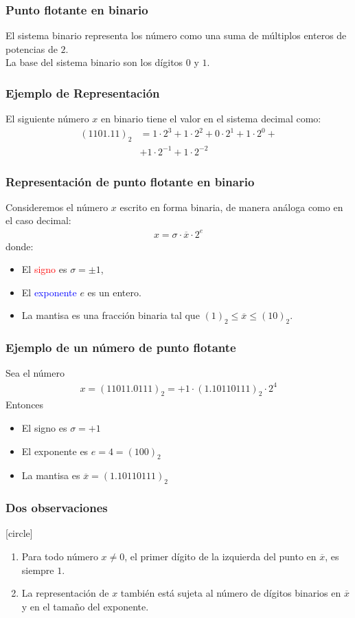 \begin{frame}
\frametitle{Punto flotante en binario}
El sistema binario representa los número como una suma de múltiplos enteros de potencias de $2$.
\\
\bigskip
\pause
La base del sistema binario son los dígitos $0$ y $1$.
\end{frame}
\begin{frame}
\frametitle{Ejemplo de Representación}
El siguiente número $x$ en binario tiene el valor en el sistema decimal como:
\begin{align*}
(1101.11)_{2} &= 1 \cdot 2^{3} + 1 \cdot 2^{2} + 0 \cdot 2^{1} + 1 \cdot 2^{0} + \\
 &+ 1 \cdot 2^{-1} + 1 \cdot 2^{-2}
\end{align*}
\end{frame}
\begin{frame}
\frametitle{Representación de punto flotante en binario}
Consideremos el número $x$ escrito en forma binaria, de manera análoga como en el caso decimal:
\begin{align*}
x =  \sigma \cdot \overline{x} \cdot 2^{e}
\end{align*}
\pause
donde: 
\begin{itemize}
\item El \textcolor{red}{signo} es $\sigma= \pm 1$,
\item El \textcolor{blue}{exponente} $e$ es un entero.
\item La \textcolor{ao}{mantisa} es una fracción binaria tal que $ (1)_{2} \leq \overline{x} \leq (10)_{2}$.
\end{itemize}
\end{frame}
\begin{frame}
\frametitle{Ejemplo de un número de punto flotante}
Sea el número
\begin{align*}
x = (11011.0111)_{2} = +1 \cdot (1.10110111)_{2} \cdot 2^{4}
\end{align*}
\pause
Entonces
\begin{itemize}
\item El signo es $\sigma = +1$
\item El exponente es $e = 4 = (100)_{2}$
\item La mantisa es $\overline{x} = (1.10110111)_{2}$
\end{itemize}
\end{frame}
\begin{frame}
\frametitle{Dos observaciones}
[circle]
\begin{enumerate}[<+->]
\item Para todo número $x \neq 0$, el primer dígito de la izquierda del punto en $\overline{x}$, es siempre $1$.
\item La representación de $x$ también está sujeta al número de dígitos binarios en $\overline{x}$ y en el tamaño del exponente.
\end{enumerate}
\end{frame}
